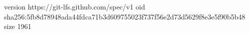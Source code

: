 version https://git-lfs.github.com/spec/v1
oid sha256:5fb8d78948ada44fdca71b3d609755023f737f56e2d73d5629f8e3e5f90b5b48
size 1961
